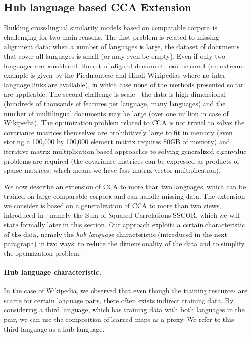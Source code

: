\documentclass[twoside,11pt]{article}
\begin{document}
\subsection{Hub language based CCA Extension}\label{sec:hublang}
Building cross-lingual similarity models based on comparable corpora is challenging for two main reasons. The first problem is related to missing alignment data: when a number of languages is large, the dataset of documents that cover all languages is small (or may even be empty). Even if only two languages are considered, the set of aligned documents can be small (an extreme example is given by the Piedmontese and Hindi Wikipedias where no inter-language links are available), in which case none of the methods presented so far are applicable.
 The second challenge is scale - the data is high-dimensional (hundreds of thousands of features per language, many languages) and the number of multilingual documents may be large (over one million in case of Wikipedia). The optimization problem related to CCA is not
 trivial to solve: the covariance matrices themselves are prohibitively large to fit in memory (even storing a 100,000 by 100,000 element matrix requires 80GB of memory) and iterative matrix-multiplication based approaches to  solving generalized eigenvalue problems are required (the covariance matrices can be expressed as products of sparse matrices, which means we have fast matrix-vector multiplication).

We now describe an extension of CCA to more than two languages, which can be trained on large comparable corpora and can handle missing data.
 The extension we consider is based on a generalization of CCA to more than two views, introduced in \cite{Kettenring}, namely the Sum of Squared Correlations SSCOR, which we will state formally later in this section. Our approach exploits a certain characteristic of the data, namely the \emph{hub language} characteristic (introduced in the next paragraph) in two
 ways: to reduce the dimensionality of the data and to simplify the optimization problem.

\paragraph{Hub language characteristic.}
In the case of Wikipedia, we observed that even though the training resources are scarce for certain language pairs, there often exists indirect training data. By considering a third language, which has training data with both languages in the pair,  we can use the composition of learned maps as a proxy. We refer to this third language as a hub language.
\end{document}
